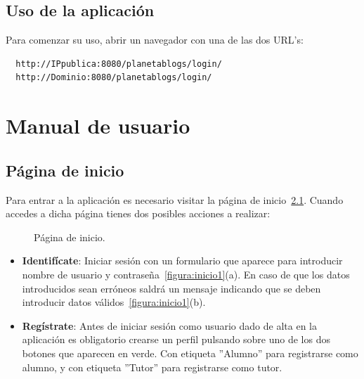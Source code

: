 \documentclass[a4paper, 12pt]{book}
\begin{document}
\section{Uso de la aplicaci\'on}
Para comenzar su uso, abrir un navegador con una de las dos URL's: 
  {\footnotesize\begin{verbatim} 
  http://IPpublica:8080/planetablogs/login/
  http://Dominio:8080/planetablogs/login/\end{verbatim}}

\cleardoublepage
\appendix
\chapter{Manual de usuario}
\label{app:manual}



\section{P\'agina de inicio}
Para entrar a la aplicaci\'on es necesario visitar la p\'agina de inicio~\ref{figura:inicio}. Cuando accedes a dicha p\'agina tienes dos posibles 
acciones a realizar:

\begin{figure}[htbp] 
  \centering
  \caption{P\'agina de inicio.}
  \label{figura:inicio}
\end{figure}

\begin{itemize}
  \item {\bfseries Identif\'icate}: Iniciar sesi\'on con un formulario que aparece para introducir nombre de usuario y contrase\~na~\ref{figura:inicio1}(a).
  En caso de que los datos introducidos sean err\'oneos saldr\'a un mensaje indicando que se deben introducir datos v\'alidos~\ref{figura:inicio1}(b).
  \item {\bfseries Reg\'istrate}: Antes de iniciar sesi\'on como usuario dado de alta en la aplicaci\'on es obligatorio crearse un perfil pulsando sobre 
  uno de los dos botones que aparecen en verde. Con etiqueta ''Alumno'' para registrarse como alumno, y con etiqueta ''Tutor'' para registrarse como tutor.
\end{itemize} 
\end{document}

